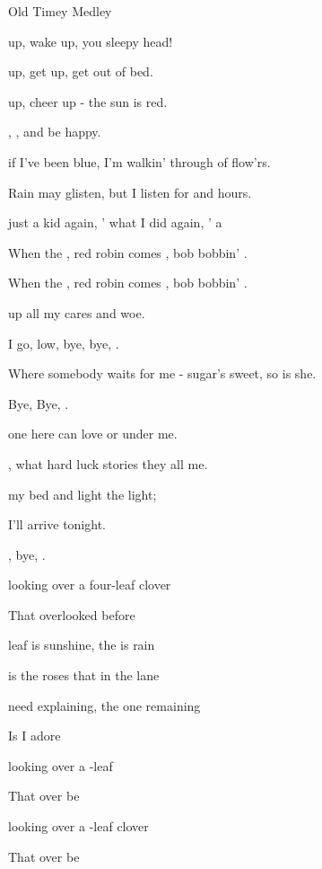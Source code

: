 \begin{SBSong}{Old Timey Medley}
\begin{SBVerse}
	 up, wake up, you sleepy head!
	
	 up, get up, get out of bed.
	
	 up, cheer up - the sun is red.
	
	,  ,   and be happy.
	
	\CBPageBrk
	
	 if I've been blue,  I'm walkin' through  of flow'rs.
	
	Rain may glisten, but  I listen for  and hours.
	
	 just a kid again, ' what I did again, ' a 
	
	When the , red robin comes , bob bobbin' .
	
	When the , red robin comes , bob bobbin' .
  \end{SBVerse}
  \WBPageBrk
  \begin{SBVerse}
     up all my cares and woe.
    
     I go,  low, bye, bye, .
    
    Where somebody waits for me - sugar's sweet, so is she.
    
    Bye, Bye, .
    
     one here can love or under me.
    
    , what hard luck stories they all  me.
    
     my bed and light the light;
    
    I'll arrive  tonight.
    
    , bye, .
  \end{SBVerse}
  \begin{SBVerse}
     looking over a four-leaf clover

    That  overlooked before

     leaf is sunshine, the  is rain

     is the roses that  in the lane

     need explaining, the one remaining

    Is  I adore

     looking over a -leaf 

    That  over be

     looking over a -leaf 
{clover}
    
    That  over be
  \end{SBVerse}
\end{SBSong}